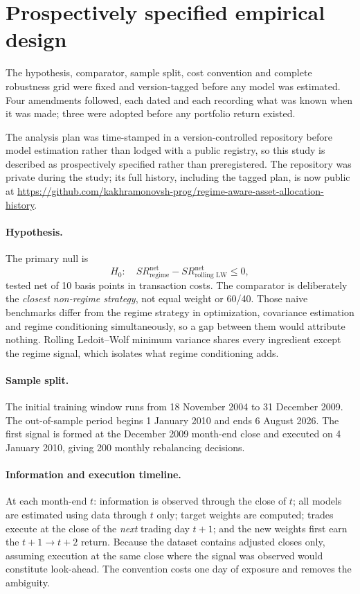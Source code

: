 \documentclass[11pt,letterpaper]{article}
\begin{document}
\section{Prospectively specified empirical design}
\label{sec:design}

The hypothesis, comparator, sample split, cost convention and complete
robustness grid were fixed and version-tagged before any model was
estimated. Four amendments followed, each dated and each recording what
was known when it was made; three were adopted before any portfolio
return existed.

The analysis plan was time-stamped in a version-controlled repository
before model estimation rather than lodged with a public registry, so
this study is described as prospectively specified rather
than preregistered. The repository was private during the study; its
full history, including the tagged plan, is now public at
\url{https://github.com/kakhramonovsh-prog/regime-aware-asset-allocation-history}.

\paragraph{Hypothesis.} The primary null is
\begin{equation}
H_0:\quad SR^{\text{net}}_{\text{regime}} -
SR^{\text{net}}_{\text{rolling LW}} \le 0,
\end{equation}
tested net of 10 basis points in transaction costs. The comparator is
deliberately the \emph{closest non-regime strategy}, not equal weight or
60/40. Those naive benchmarks differ from the regime strategy in
optimization, covariance estimation and regime conditioning
simultaneously, so a gap between them would attribute nothing. Rolling
Ledoit--Wolf minimum variance shares every ingredient except the regime
signal, which isolates what regime conditioning adds.

\paragraph{Sample split.} The initial training window runs from
18 November 2004 to 31 December 2009. The out-of-sample period begins
1 January 2010 and ends 6 August 2026. The first signal is formed at the
December 2009 month-end close and executed on 4 January 2010, giving 200
monthly rebalancing decisions.

\paragraph{Information and execution timeline.} At each month-end $t$:
information is observed through the close of $t$; all models are
estimated using data through $t$ only; target weights are computed;
trades execute at the close of the \emph{next} trading day $t+1$; and
the new weights first earn the $t{+}1 \to t{+}2$ return. Because the
dataset contains adjusted closes only, assuming execution at the same
close where the signal was observed would constitute look-ahead. The
convention costs one day of exposure and removes the ambiguity.
\end{document}
